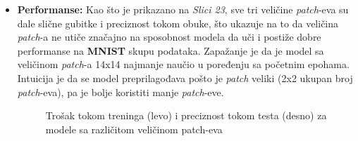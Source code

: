 \documentclass[12pt]{article}
\begin{document}
   \begin{itemize}
      \item \textbf{Performanse:} Kao što je prikazano na \textit{Slici 23}, sve tri 
      veličine \textit{patch}-eva su dale slične gubitke i preciznost tokom obuke, što ukazuje 
      na to da veličina \textit{patch}-a ne utiče značajno na sposobnost modela da uči i 
      postiže dobre performanse na \textbf{MNIST} skupu podataka. Zapažanje je da je model sa
      veličinom \textit{patch}-a 14x14 najmanje naučio u poređenju sa početnim epohama. Intuicija
      je da se model preprilagođava pošto je \textit{patch} veliki (2x2 ukupan broj \textit{patch}-eva), pa
      je bolje koristiti manje \textit{patch}-eve. 
      \begin{figure}[h!]
         \centering
         \vspace{1cm} %
         \caption{Trošak tokom treninga (levo) i preciznost tokom testa (desno) za modele sa različitom veličinom patch-eva}
         \label{fig:exp3_metr}
      \end{figure}


\end{itemize}
\end{document}
